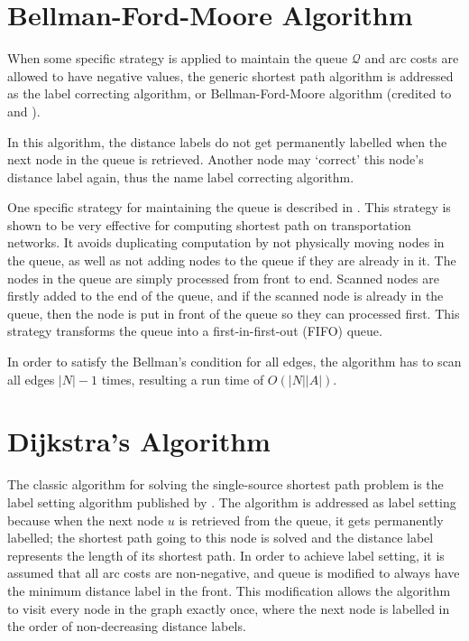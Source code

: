 \section{Bellman-Ford-Moore Algorithm} \label{section:labelcorrectingalgorithm}
When some specific strategy is applied to maintain the queue $\mathcal{Q}$
and arc costs are allowed to have negative values,
the generic shortest path algorithm is addressed as the label correcting algorithm,
or Bellman-Ford-Moore algorithm (credited to \citet{Bellman, Ford} and \citet{Moore}).

In this algorithm,
the distance labels do not get permanently labelled when the next node in the queue is retrieved.
Another node may `correct' this node's distance label again,
thus the name label correcting algorithm.

One specific strategy for maintaining the queue is described in \citet{Sheffi}.
This strategy is shown to be very effective for computing shortest path on transportation networks.
It avoids duplicating computation by not physically moving nodes in the queue,
as well as not adding nodes to the queue if they are already in it.
The nodes in the queue are simply processed from front to end.
Scanned nodes are firstly added to the end of the queue,
and if the scanned node is already in the queue,
then the node is put in front of the queue so they can processed first.
This strategy transforms the queue into a first-in-first-out (FIFO) queue.

In order to satisfy the Bellman's condition for all edges,
the algorithm has to scan all edges $|N|-1$ times,
resulting a run time of $O(|N||A|)$.

\section{Dijkstra's Algorithm} \label{sec:dijkstra}
The classic algorithm for solving the single-source shortest path problem is the label setting algorithm published by \citet{Dijkstra}.
The algorithm is addressed as label setting because when the next node $u$ is retrieved from the queue,
it gets permanently labelled;
the shortest path going to this node is solved and 
the distance label represents the length of its shortest path.
In order to achieve label setting, 
it is assumed that all arc costs are non-negative,
and queue is modified to always have the minimum distance label in the front.
This modification allows the algorithm to visit every node in the graph exactly once,
where the next node is labelled in the order of non-decreasing distance labels.


